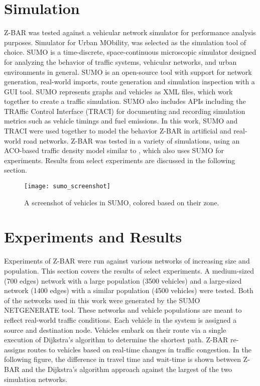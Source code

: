 \documentclass[conference]{IEEEtran}
\begin{document}
\section{Simulation}

Z-BAR was tested against a vehicular network simulator for performance analysis purposes. Simulator for Urban MObility, \cite{sumo} was selected as the simulation tool of choice. SUMO is a time-discrete, space-continuous microscopic simulator designed for analyzing the behavior of traffic systems, vehicular networks, and urban environments in general. SUMO is an open-source tool with support for network generation, real-world imports, route generation and simulation inspection with a GUI tool. SUMO represents graphs and vehicles as XML files, which work together to create a traffic simulation. SUMO also includes APIs including the TRAffic Control Interface (TRACI) \cite{traci} for documenting and recording simulation metrics such as vehicle timings and fuel emissions. In this work, SUMO and TRACI were used together to model the behavior Z-BAR in artificial and real-world road networks. Z-BAR was tested in a variety of simulations, using an ACO-based traffic density model similar to \cite{iaco}, which also uses SUMO for experiments. Results from select experiments are discussed in the following section.

\begin{figure}[h]
\caption{A screenshot of vehicles in SUMO, colored based on their zone.}
\centering
\texttt{[image: sumo\_screenshot]}
\end{figure}

\section{Experiments and Results} %

Experiments of Z-BAR were run against various networks of increasing size and population. This section covers the results of select experiments. A medium-sized (700 edges) network with a large population (3500 vehicles) and a large-sized network (1400 edges) with a similar population (4500 vehicles) were tested. Both of the networks used in this work were generated by the SUMO NETGENERATE tool. These networks and vehicle populations are meant to reflect real-world traffic conditions. Each vehicle in the system is assigned a source and destination node. Vehicles embark on their route via a single execution of Dijkstra's algorithm to determine the shortest path. Z-BAR re-assigns routes to vehicles based on real-time changes in traffic congestion. In the following figure, the difference in travel time and wait-time is shown between Z-BAR and the Dijkstra's algorithm approach against the largest of the two simulation networks.
\end{document}
